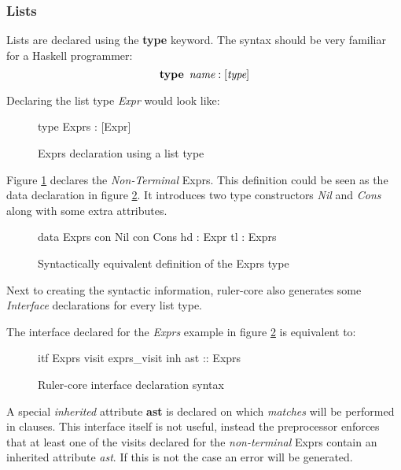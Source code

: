 \subsubsection{Lists}
Lists are declared using the \textbf{type} keyword. The syntax should be very familiar for a Haskell programmer: \[ \textbf{type} \hspace{5pt} \emph{name} : [\emph{type}] \]

Declaring the list type \emph{Expr} would look like:

\begin{figure}[H]
\begin{code}
type Exprs : [Expr]
\end{code}
\caption{Exprs declaration using a list type}
\label{type:exprs}
\end{figure}

Figure \ref{type:exprs} declares the \emph{Non-Terminal} Exprs. This definition could be seen as the data declaration in figure \ref{type:lists}. It introduces  two type constructors \emph{Nil} and \emph{Cons} along with some extra attributes.

\begin{figure}[H]
\begin{code}
data Exprs
  con Nil
  con Cons
    hd  : Expr
    tl  : Exprs
\end{code}
\caption{Syntactically equivalent definition of the Exprs type}
\label{type:lists}
\end{figure}

Next to creating the syntactic information, ruler-core also generates some \emph{Interface} declarations for every list type. 

The interface declared for the \emph{Exprs} example in figure \ref{type:lists} is equivalent to:

\begin{figure}[h!]
\begin{code}
itf Exprs
  visit exprs_visit
    inh ast :: Exprs
\end{code}
\caption{Ruler-core interface declaration syntax}
\label{itf:exprs}
\end{figure}

A special \emph{inherited} attribute \textbf{ast} is declared on which \emph{matches} will be performed in clauses. This interface itself is not useful, instead the preprocessor enforces that at least one of the visits declared for the \emph{non-terminal} Exprs contain an inherited attribute \emph{ast}. If this is not the case an error will be generated.

